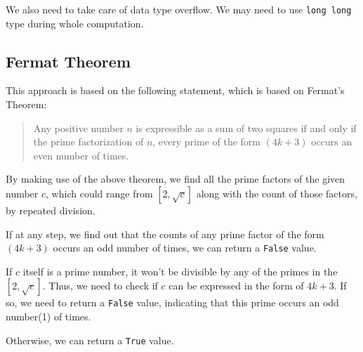 We also need to take care of data type overflow. We may need to use \texttt{long long} type during whole computation.


\subsection{Fermat Theorem}

This approach is based on the following statement, which is based on Fermat's Theorem:

\begin{quote}
    Any positive number $n$ is expressible as a sum of two squares if and only if the prime factorization of $n$, every prime of the form $(4k+3)$ occurs an even number of times.

\end{quote}

By making use of the above theorem, we find all the prime factors of the given number $c$, which could range from $[2,\sqrt{c}]$ along with the count of those factors, by repeated division. 

If at any step, we find out that the counts of any prime factor of the form $(4k+3)$ occurs an odd number of times, we can return a \texttt{False} value.

If $c$ itself is a prime number, it won't be divisible by any of the primes in the $[2,\sqrt{c}]$. Thus, we need to check if $c$ can be expressed in the form of $4k+3$. If so, we need to return a \texttt{False} value, indicating that this prime occurs an odd number(1) of times.

Otherwise, we can return a \texttt{True} value.
